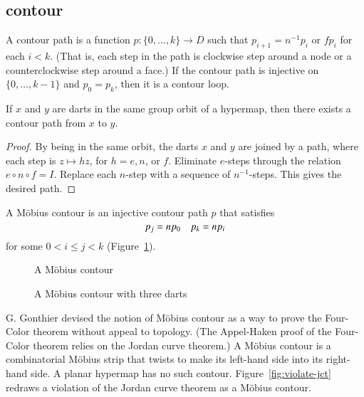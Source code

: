 \subsection{contour}

\begin{definition}  A contour path is a function $p:\{0,\ldots,k\}\to D$
such that $p_{i+1} =
n^{-1} p_i$ or $f p_i$ for each $i<k$.  (That is, each
step in the path is clockwise step around a node or a
counterclockwise step around a face.)   If the contour path
is injective on $\{0,\ldots,k-1\}$
and  $p_0 = p_k$, then it is a contour loop.
\end{definition}

\begin{lemma}  If $x$ and $y$ are darts
in the same group orbit of a hypermap, then there exists
a contour path from $x$ to $y$.
\end{lemma}

\begin{proof} 
By being in the same orbit, the darts
$x$ and $y$ are joined by a path, where each step
is $z\mapsto h z$, for $h=e,n$, or $f$.  Eliminate $e$-steps
through the relation $e\circ
n\circ f = I$.   Replace each $n$-step with a sequence of
$n^{-1}$-steps.  This gives the desired path.
\end{proof}

\begin{definition} A M\"obius contour is an
injective contour path $p$ that satisfies
    \begin{equation}
    \tlabel{eqn:mobius}
    p_j = n p_0\quad p_k = n p_i
    \end{equation}
for some $0 < i\le j< k$ (Figure~\ref{fig:mobius}).
\end{definition}

\begin{figure}[htb]
  \centering
  \caption{A M\"obius contour}
  \label{fig:mobius}
\end{figure}

\begin{figure}[htb]
  \centering
  \caption{A M\"obius contour with three darts}
  \label{fig:3m}
\end{figure}


\begin{remark}
G. Gonthier devised the notion of M\"obius contour
as a way to prove the Four-Color theorem without appeal
to topology.  (The Appel-Haken
proof of the Four-Color theorem relies on the Jordan
curve theorem.)  A M\"obius contour is a 
combinatorial M\"obius strip that
twists to make 
its left-hand side into
its right-hand side.  A planar hypermap has no such contour.  
Figure~\ref{fig:violate-jct}
redraws a violation of the Jordan curve theorem
as a M\"obius contour.   
\end{remark}

